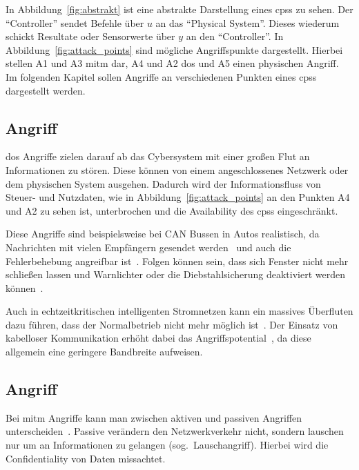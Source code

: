 \documentclass[final,bibliography=totocnumbered]{include/sikseminar}
\newcommand{\cps}{\glspl{cps}\xspace}
\begin{document}
In Abbildung~\ref{fig:abstrakt} ist eine abstrakte Darstellung eines \cps zu sehen.
Der \enquote{Controller} sendet Befehle über $u$ an das \enquote{Physical System}.
Dieses wiederum schickt Resultate oder Sensorwerte über $y$ an den \enquote{Controller}.
In Abbildung~\ref{fig:attack_points} sind mögliche Angriffspunkte dargestellt.
Hierbei stellen A1 und A3 \gls{mitm} dar, A4 und A2 \gls{dos} und A5 einen physischen Angriff.
Im folgenden Kapitel sollen Angriffe an verschiedenen Punkten eines \cps dargestellt werden.


\subsection{ Angriff}\label{subsec:dos}
\gls{dos} Angriffe zielen darauf ab das Cybersystem mit einer großen Flut an Informationen zu stören.
Diese können von einem angeschlossenes Netzwerk oder dem physischen System ausgehen.
Dadurch wird der Informationsfluss von Steuer- und Nutzdaten, wie in Abbildung~\ref{fig:attack_points} an den Punkten A4 und A2 zu sehen ist, unterbrochen und die Availability des \cps eingeschränkt.

Diese Angriffe sind beispielsweise bei CAN Bussen in Autos realistisch, da Nachrichten mit vielen Empfängern gesendet werden~\cite{KCR+10} und auch die Fehlerbehebung angreifbar ist~\cite{CDV13}.
Folgen können sein, dass sich Fenster nicht mehr schließen lassen und Warnlichter oder die Diebstahlsicherung deaktiviert werden können~\cite{HKD08}.

Auch in echtzeitkritischen intelligenten Stromnetzen kann ein massives Überfluten dazu führen, dass der Normalbetrieb nicht mehr möglich ist~\cite{LLW+10}.
Der Einsatz von kabelloser Kommunikation erhöht dabei das Angriffspotential~\cite{LWW11}, da diese allgemein eine geringere Bandbreite aufweisen.

\subsection{ Angriff}\label{subsec:mitm}
Bei \gls{mitm} Angriffe kann man zwischen aktiven und passiven Angriffen unterscheiden~\cite{WYX+10}.
Passive verändern den Netzwerkverkehr nicht, sondern lauschen nur um an Informationen zu gelangen (sog.\ Lauschangriff).
Hierbei wird die Confidentiality von Daten missachtet.
\end{document}
